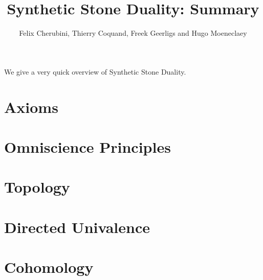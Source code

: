 \documentclass{../util/zariski-small}
\title{Synthetic Stone Duality: Summary}
\begin{document}
\author{Felix Cherubini, Thierry Coquand, Freek Geerligs and Hugo Moeneclaey}

\maketitle

We give a very quick overview of Synthetic Stone Duality.

\section{Axioms}


\section{Omniscience Principles}


\section{Topology}


\section{Directed Univalence}


\section{Cohomology}

\end{document}
